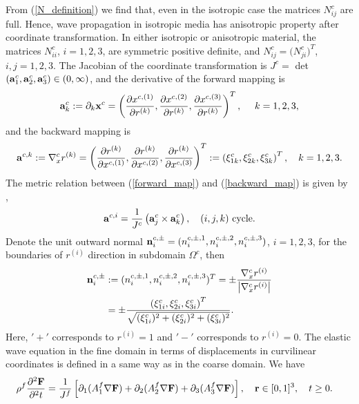 From (\ref{N_definition}) we find that, even in the isotropic case the matrices $N_{ij}^c$ are full. Hence, wave propagation in isotropic media has anisotropic property after coordinate transformation. In either isotropic or anisotropic material, the matrices $N_{ii}^c$, $i = 1,2,3$, are symmetric positive definite, and $N_{ij}^c=\big(N_{ji}^c\big)^T$, $i,j=1,2,3$. The Jacobian of the coordinate transformation is $J^c =$ \mbox{det}$\left({\bf a}^c_1,{\bf a}^c_2,{\bf a}^c_3\right)\in (0,\infty)$, and the derivative of the forward mapping is 
\begin{equation}\label{forward_map}
{\bf a}_k^c := \partial_k{\bf x}^c  = \left(\frac{\partial x^{c,(1)}}{\partial r^{(k)}},\frac{\partial x^{c,(2)}}{\partial r^{(k)}},\frac{\partial x^{c,(3)}}{\partial r^{(k)}}\right)^T,\ \ \ \ k = 1,2,3,
\end{equation}
and the backward mapping is
\begin{equation}\label{backward_map}
{\bf a}^{c,k} := \nabla_x^c r^{(k)} = \left(\frac{\partial r^{(k)}}{\partial x^{c,(1)}},\frac{\partial r^{(k)}}{\partial x^{c,(2)}},\frac{\partial r^{(k)}}{\partial x^{c,(3)}}\right)^T := \left(\xi_{1k}^c,\xi_{2k}^c,\xi_{3k}^c\right)^T,\ \ \ k = 1,2,3.
\end{equation}
 The metric relation between (\ref{forward_map}) and (\ref{backward_map}) is given by \cite{thompson1985numerical},
\begin{equation*}
{\bf a}^{c,i} = \frac{1}{J^c}\left({\bf a}_j^c\times{\bf a}_k^c\right), \ \ \ (i,j,k) \ \mbox{cycle}.
\end{equation*}
Denote the unit outward normal ${\bf n}_i^{c,\pm} = (n_i^{c,\pm,1},n_i^{c,\pm,2},n_i^{c,\pm,3})$, $i = 1,2,3$, for the boundaries of $r^{(i)}$ direction in subdomain $\Omega^c$, then
\begin{align}\label{outward_normal}
{\bf n}_i^{c,\pm} &:= (n^{c,\pm,1}_i,n^{c,\pm,2}_i,n^{c,\pm,3}_i)^T = \pm \frac{\nabla_x^c r^{(i)}}{\left|\nabla_x^c r^{(i)}\right|} \nonumber\\
&= \pm\frac{ \left(\xi_{1i}^c,\xi_{2i}^c,\xi_{3i}^c\right)^T}{\sqrt{(\xi_{1i}^c)^2+(\xi_{2i}^c)^2+(\xi_{3i}^c)^2}}.
\end{align}
Here, $'+'$ corresponds to $r^{(i)} = 1$ and $'-'$ corresponds to $r^{(i)} = 0$. The elastic wave equation in the fine domain in terms of displacements in curvilinear coordinates is defined in a same way as in the  coarse domain. We have 
\begin{align}\label{elastic_curvi_f}
	\rho^f\frac{\partial^2{\bf F}}{\partial^2 t} &= \frac{1}{J^f}\left[\partial_1(A_1^f\nabla{\bf F}) + \partial_2(A_2^f\nabla{\bf F}) +\partial_3(A_3^f\nabla{\bf F}) \right], \ \ \  {\bf r}\in [0,1]^3,\ \ \  t\geq0.
\end{align}

